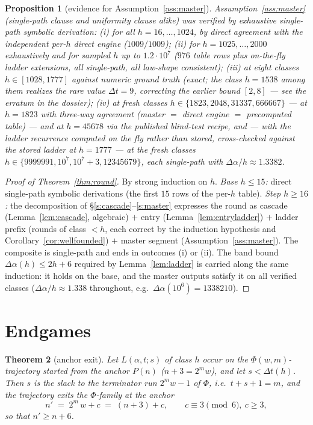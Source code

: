 \documentclass[11pt]{amsart}
\newtheorem{theorem}{Theorem}[section]
\newtheorem{proposition}[theorem]{Proposition}
\theoremstyle{definition}
\begin{document}
\begin{proposition}[evidence for Assumption~\ref{ass:master}]\label{prop:master}
Assumption~\ref{ass:master} (single-path clause and uniformity clause
alike) was verified by exhaustive single-path symbolic
derivation: (i) for all $h=16,\dots,1024$, by direct agreement with the
independent per-$h$ direct engine ($1009/1009$); (ii) for $h=1025,\dots,2000$
exhaustively and for sampled $h$ up to $1.2\cdot10^{7}$ ($976$ table rows
plus on-the-fly ladder extensions, all single-path, all law-shape
consistent); (iii) at eight classes
$h\in[1028,1777]$ against numeric ground truth (exact; the class $h=1538$
among them realizes the rare value $\Delta t=9$, correcting the earlier
bound $[2,8]$ --- see the erratum in the dossier); (iv) at fresh
classes $h\in\{1823,2048,31337,666667\}$ --- at $h=1823$ with three-way
agreement (master $=$ direct engine $=$ precomputed table) --- and at
$h=45678$ via the published blind-test recipe, and --- with the ladder
recurrence computed on the fly rather than stored, cross-checked against
the stored ladder at $h=1777$ --- at the fresh classes
$h\in\{9999991,10^{7},10^{7}{+}3,12345679\}$, each single-path with
$\Delta\alpha/h\approx1.3382$.
\end{proposition}

\begin{proof}[Proof of Theorem~\ref{thm:round}]
By strong induction on $h$. \emph{Base $h\le15$:} direct single-path
symbolic derivations (the first $15$ rows of the per-$h$ table).
\emph{Step $h\ge16$:} the decomposition of \S\ref{s:cascade}--\ref{s:master}
expresses the round as cascade (Lemma~\ref{lem:cascade}, algebraic) $+$
entry (Lemma~\ref{lem:entryladder}) $+$ ladder prefix (rounds of class
$<h$, each correct by the induction hypothesis and
Corollary~\ref{cor:wellfounded}) $+$ master segment
(Assumption~\ref{ass:master}). The composite is single-path and ends in
outcomes (i) or (ii). The band bound $\Delta\alpha(h)\le2h+6$ required by
Lemma~\ref{lem:ladder} is carried along the same induction: it holds on the
base, and the master outputs satisfy it on all verified classes
($\Delta\alpha/h\approx1.338$ throughout, e.g.\ $\Delta\alpha(10^6)
=1338210$).
\end{proof}

\section{Endgames}\label{s:endgame}

\begin{theorem}[anchor exit]\label{thm:endgame}
Let $L(\alpha,t;s)$ of class $h$ occur on the $\Phi(w,m)$-trajectory
started from the anchor $P(n)$ ($n+3=2^{m}w$), and let $s<\Delta t(h)$.
Then $s$ is the slack to the \emph{terminator} run $2^{m}w-1$ of $\Phi$,
i.e.\ $t+s+1=m$, and the trajectory exits the $\Phi$-family at the anchor
\[
n' \;=\; 2^{m}\,w+c\;=\;(n+3)+c,\qquad c\equiv3\pmod6,\ c\ge3,
\]
so that $n'\ge n+6$.
\end{theorem}
\end{document}
